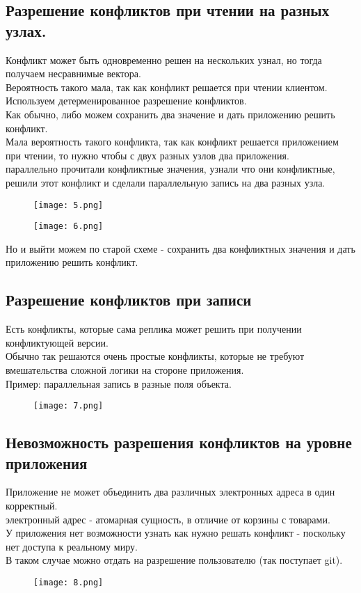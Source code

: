 \subsection{Разрешение конфликтов при чтении на разных узлах.}
Конфликт может быть одновременно решен на нескольких узнал, но тогда получаем несравнимые вектора.\\
Вероятность такого мала, так как конфликт решается при чтении клиентом.\\
Используем детерменированное разрешение конфликтов.\\
Как обычно, либо можем сохранить два значение и дать приложению решить конфликт.\\
Мала вероятность такого конфликта, так как конфликт решается приложением при чтении, то нужно чтобы с двух разных узлов два приложения.\\ параллельно прочитали конфликтные значения, узнали что они конфликтные, решили этот конфликт и сделали параллельную запись на два разных узла.\\
\begin{figure}[h]
    \centering
    \texttt{[image: 5.png]}
    \caption{}
\end{figure}
\begin{figure}[h]
    \centering
    \texttt{[image: 6.png]}
    \caption{}
\end{figure}
Но и выйти можем по старой схеме - сохранить два конфликтных значения и дать приложению решить конфликт.
\subsection{Разрешение конфликтов при записи}
Есть конфликты, которые сама реплика может решить при получении конфликтующей версии.\\
Обычно так решаются очень простые конфликты, которые не требуют вмешательства сложной логики на стороне приложения.\\
Пример: параллельная запись в разные поля объекта.
\begin{figure}[h]
    \centering
    \texttt{[image: 7.png]}
    \caption{}
\end{figure}
\subsection{Невозможность разрешения конфликтов на уровне приложения}
Приложение не может объединить два различных электронных адреса в один корректный.\\
электронный адрес - атомарная сущность, в отличие от корзины с товарами.\\
У приложения нет возможности узнать как нужно решать конфликт - поскольку нет доступа к реальному миру.\\
В таком случае можно отдать на разрешение пользователю (так поступает git).
\begin{figure}[h]
    \centering
    \texttt{[image: 8.png]}
    \caption{}    
\end{figure}
